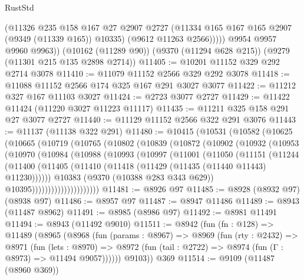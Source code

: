 \begin{lexlean}{RustStd}
\begin{coremodule}
{\begin{coremodule}
{{{{{{{{{{{{{{{{{{{{{{{{{{{{{{{{{{{{{{{              (@11326
                @235
                @158
                @167
                @27
                @2907
                @2727
                (@11334 @165 @167 @165 @2907 (@9349 (@11339 @165)) @10335)
                (@9612 @11263 @2566)))))
        @9954
        @9957
        @9960
        @9963))
    (@10162 (@11289 @90))
    (@9370 (@11294 @628 @215))
    (@9279 (@11301 @215 @135 @2898 @2714))
@11405 := @10201 @11152 @329 @292 @2714 @3078
@11410 := @11079 @11152 @2566 @329 @292 @3078
@11418 := @11088 @11152 @2566 @174 @325 @167 @291 @3027 @3077
@11422 := @11212 @327 @167 @11103 @3027
@11424 := @2723 @3077 @2727
@11429 := @11422 @11424 (@11220 @3027 @11223 @11117)
@11435 := @11211 @325 @158 @291 @27 @3077 @2727
@11440 := @11129 @11152 @2566 @322 @291 @3076
@11443 := @11137 (@11138 @322 @291)
@11480 := @10415
    (@10531
      (@10582
        (@10625
          (@10665
            (@10719
              (@10765
                (@10802
                  (@10839
                    (@10872
                      (@10902
                        (@10932
                          (@10953
                            (@10970
                              (@10984
                                (@10988
                                  (@10993
                                    (@10997
                                      (@11001
                                        (@11050
                                          (@11151
                                            (@11244
                                              (@11400
                                                (@11405
                                                  (@11410
                                                    (@11418
                                                      (@11429 (@11435 (@11440 @11443) @11230))))))
                                              @10383
                                              (@9370 (@10388 @283 @343 @629))
                                              @10395)))))))))))))))))))))
@11481 := @8926 @97
@11485 := @8928 (@8932 @97) (@8938 @97)
@11486 := @8957 @97
@11487 := @8947 @11486
@11489 := @8943 (@11487 @8962)
@11491 := @8985 (@8986 @97)
@11492 := @8981 @11491
@11494 := @8943 (@11492 @9010)
@11511 := @8942
    (fun (fn : @128) =>
    @11489
      (@8965
        (@8968
          (fun (params : @8967) =>
          @8969
            (fun (rty : @2432) =>
            @8971
              (fun (lets : @8970) =>
              @8972 (fun (tail : @2722) => @8974 (fun (Γ : @8973) => @11494 @9057))))))
        @9103))
    @369
@11514 := @9109 (@11487 (@8960 @369))
}}}}}}}}}}}}}}}}}}}}}}}}}}}}}}}}}}}}}}}
\end{coremodule}}
\end{coremodule}
\end{lexlean}
